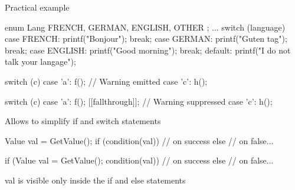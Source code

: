 \begin{frame}[fragile]
  \begin{exampleblock}{Practical example}
    \begin{cppcode*}{}
      enum Lang { FRENCH, GERMAN, ENGLISH, OTHER };
      ...
      switch (language) {
      case FRENCH:
        printf("Bonjour");
        break;
      case GERMAN:
        printf("Guten tag");
        break;
      case ENGLISH:
        printf("Good morning");
        break;
      default:
        printf("I do not talk your langage");
      }
    \end{cppcode*}
  \end{exampleblock}
\end{frame}


\begin{frame}[fragile]
  \begin{alertblock}{}
    \begin{cppcode}
      switch (c) {
        case 'a':
          f(); // Warning emitted
        case 'c':
          h();
      }
    \end{cppcode}
  \end{alertblock}
  \begin{exampleblock}{}
    \begin{cppcode*}{}
      switch (c) {
        case 'a':
          f();
          [[fallthrough]]; // Warning suppressed
        case 'c':
          h();
      }
    \end{cppcode*}
  \end{exampleblock}
\end{frame}

\begin{frame}[fragile]
  Allows to simplify if and switch statements
  \begin{alertblock}{}
    \begin{cppcode*}{}
      Value val = GetValue();
      if (condition(val)) {
        // on success
      } else {
        // on false...
      }
    \end{cppcode*}
  \end{alertblock}
  \begin{exampleblock}{}
    \begin{cppcode*}{}
      if (Value val = GetValue(); condition(val)) {
        // on success
      } else {
        // on false...
      }
    \end{cppcode*}
    \vspace{-.1cm}
    val is visible only inside the if and else statements
  \end{exampleblock}  
\end{frame}

